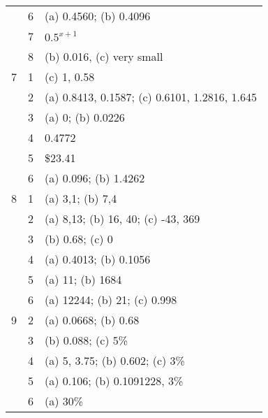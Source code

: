 \documentclass[bigtut]{tutorial}
\begin{document}
\begin{tutorial}
\begin{tabular}{|l |l |l |}
  & 6 & (a) 0.4560; (b) 0.4096 \\
  & 7 & $0.5^{x+1}$ \\
  & 8 & (b) 0.016, (c) very small \\ \hline
7 & 1 & (c) 1, 0.58 \\
  &  2 & (a) 0.8413, 0.1587; (c) 0.6101, 1.2816, 1.645 \\
  & 3 & (a) 0; (b) 0.0226 \\
  & 4 & 0.4772 \\
  & 5 & \$23.41 \\
  & 6 & (a) 0.096; (b) 1.4262 \\ \hline
8  & 1 & (a) 3,1; (b) 7,4  \\
  & 2 & (a) 8,13; (b) 16, 40; (c) -43, 369 \\
  & 3 & (b)  0.68; (c) 0 \\
  & 4 & (a) 0.4013; (b) 0.1056 \\
  & 5 & (a) 11; (b) 1684 \\
  & 6 & (a) 12244; (b) 21; (c) 0.998 \\ \hline
9 & 2 & (a) 0.0668; (b) 0.68 \\
  & 3 & (b) 0.088; (c) 5\% \\
  & 4 & (a) 5, 3.75; (b) 0.602; (c) 3\% \\ 
  & 5 & (a) 0.106; (b) 0.1091228, 3\% \\
  & 6 & (a) 30\%  \\ \hline
\end{tabular}


\end{tutorial}
\end{document}
